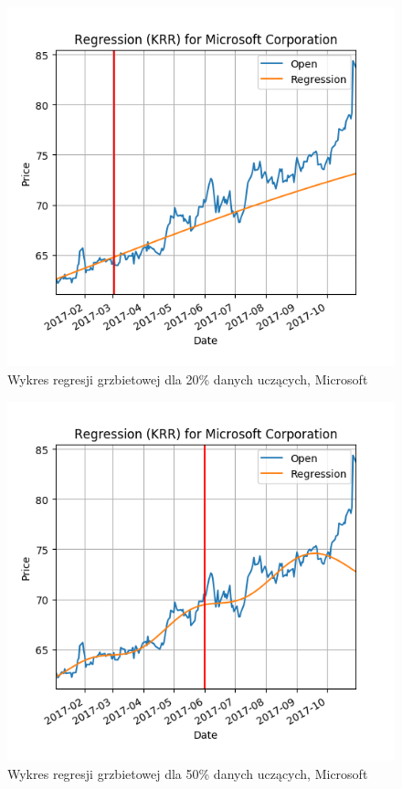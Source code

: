 \begin{figure}[h!]
\centering
\includegraphics[width=150mm]{pictures/plots/microsoft_krr_20.png}
\caption{Wykres regresji grzbietowej dla 20\% danych uczących, Microsoft}
\label{fig:Wykres regresji grzbietowej dla 20\% danych uczących, Microsoft}
\end{figure}

\begin{figure}[h!]
\centering
\includegraphics[width=150mm]{pictures/plots/microsoft_krr_50.png}
\caption{Wykres regresji grzbietowej dla 50\% danych uczących, Microsoft}
\label{fig:Wykres regresji grzbietowej dla 50\% danych uczących, Microsoft}
\end{figure}

